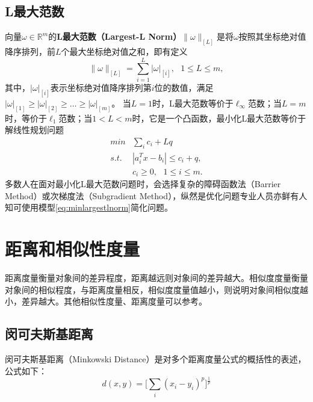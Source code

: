 \subsection{L最大范数}
向量$\omega\in \mathbb{R}^m$的\textbf{L最大范数（Largest-L Norm）}$\|\omega\|_{[L]}$是将$\omega$按照其坐标绝对值降序排列，前$L$个最大坐标绝对值之和，即有定义
\begin{equation}\label{eq:largestlnorm}
    \|\omega\|_{[L]} = \sum\limits_{i=1}^L |\omega|_{[i]}, ~~~1\le L\le m,
\end{equation}
其中，$|\omega|_{[i]}$表示坐标绝对值降序排列第$i$位的数值，满足$|\omega|_{[1]} \ge |\omega|_{[2]} \ge \ldots \ge |\omega|_{[m]}$。
当$L=1$时，L最大范数等价于$\ell_{\infty}$范数；当$L=m$时，等价于$\ell_1$范数；当$1 < L < m$时，它是一个凸函数，最小化L最大范数等价于解线性规划问题
\begin{equation}\label{eq:minlargestlnorm}
    \begin{array}{ll}
      \textit{min} & \sum\limits_i c_i + Lq \\
      \textit{s.t.} & |a_i^T x - b_i|\le c_i + q,\\
      & c_i \ge 0, ~~~1\le i\le m.
    \end{array}
\end{equation}
多数人在面对最小化L最大范数问题时，会选择复杂的障碍函数法（Barrier Method）或次梯度法（Subgradient Method），纵然是优化问题专业人员亦鲜有人知可使用模型\eqref{eq:minlargestlnorm}简化问题。

\section{距离和相似性度量}
距离度量衡量对象间的差异程度，距离越远则对象间的差异越大。相似度度量衡量对象间的相似程度，与距离度量相反，相似度度量值越小，则说明对象间相似度越小，差异越大。其他相似性度量、距离度量可以参考\cite{cha2007comprehensive,lenz2008proximities}。

\subsection{闵可夫斯基距离}
闵可夫斯基距离（Minkowski Distance）是对多个距离度量公式的概括性的表述，公式如下：
\begin{equation}\label{eq:minkowski}
    d(x,y)=\Big[\sum\limits_i (x_i-y_i)^p\Big]^\frac{1}{p}
\end{equation}

